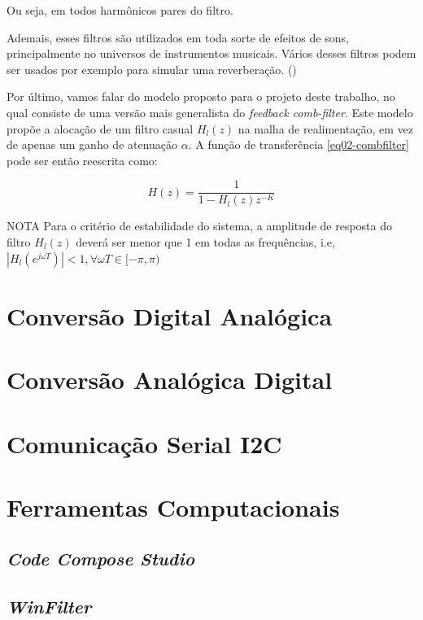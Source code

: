 		Ou seja, em todos harmônicos pares do filtro.
				
		Ademais, esses filtros são utilizados em toda sorte de efeitos de sons, principalmente no universos de instrumentos musicais. Vários desses filtros podem ser usados por exemplo para simular uma reverberação. (\cite{JuliusO.Smith2010})
		
		Por último, vamos falar do modelo proposto para o projeto deste trabalho, no qual consiste de uma versão mais generalista do \textit{feedback comb-filter}. Este modelo propõe a alocação de um filtro casual $H_l(z)$ na malha de realimentação, em vez de apenas um ganho de atenuação $\alpha$. A função de transferência \ref{eq02-combfilter} pode ser então reescrita como:
		
		\begin{equation}
			H(z) = \frac{1}{1-H_l(z)z^{-K}}
		\end{equation}
		
		\begin{mymdframed}{NOTA}
			Para o critério de estabilidade do sistema, a amplitude de resposta do filtro $ H_l(z) $ deverá ser menor que 1 em todas as frequências, i.e, $ |H_l(e^{j\omega T})| < 1, \forall \omega T \in [-\pi,\pi)$
		\end{mymdframed}
		
		
		
\section{Conversão Digital Analógica}

\section{Conversão Analógica Digital}

\section{Comunicação Serial I2C}
	
\section{Ferramentas Computacionais}

	\subsection{\textit{Code Compose Studio}}
	
	\subsection{\textit{WinFilter}}
